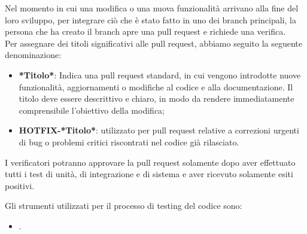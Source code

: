 Nel momento in cui una modifica o una nuova funzionalità arrivano alla fine del loro sviluppo, per integrare ciò che è stato fatto in uno dei branch principali, la persona che ha creato il branch apre una pull request e richiede una verifica. \\
Per assegnare dei titoli significativi alle pull request, abbiamo seguito la seguente denominazione:
\begin{itemize}
    \item \textbf{*Titolo*}: Indica una pull request standard, in cui vengono introdotte nuove funzionalità, aggiornamenti o modifiche al codice e alla documentazione. Il titolo deve essere descrittivo e chiaro, in modo da rendere immediatamente comprensibile l'obiettivo della modifica;
    \item \textbf{HOTFIX-*Titolo*}: utilizzato per pull request relative a correzioni urgenti di bug o problemi critici riscontrati nel codice già rilasciato.
\end{itemize}
I verificatori potranno approvare la pull request solamente dopo aver effettuato tutti i test di unità, di integrazione e di sistema e aver ricevuto solamente esiti positivi.

Gli strumenti utilizzati per il processo di testing del codice sono:
\begin{itemize}
    \item {}.
\end{itemize}